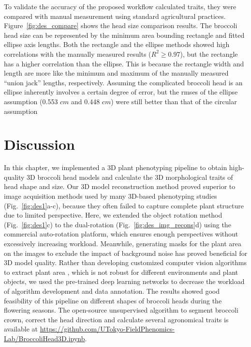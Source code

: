 To validate the accuracy of the proposed workflow calculated traits, they were compared with manual measurement using standard agricultural practices. Figure~\ref{fig:des_compare} shows the head size comparison results. The broccoli head size can be represented by the minimum area bounding rectangle and fitted ellipse axis lengths. Both the rectangle and the ellipse methods showed high correlations with the manually measured results ($R^2 \geq 0.97$), but the rectangle has a higher correlation than the ellipse. This is because the rectangle width and length are more like the minimum and maximum of the manually measured ``union jack'' lengths, respectively. Assuming the complicated broccoli head is an ellipse inherently involves a certain degree of error, but the \gls{rmse}s of the ellipse assumption (0.553 $cm$ and 0.448 $cm$) were still better than that of the circular assumption \citep[Table 5, \gls{rmse}=0.97 $cm$]{blok_image_2021}



\section{Discussion}

In this chapter, we implemented a 3D plant phenotyping pipeline to obtain high-quality 3D broccoli head models and calculate the 3D morphological traits of head shape and size. Our 3D model reconstruction method proved superior to image acquisition methods used by many 3D-based phenotyping studies (Fig.~\ref{fig:des1}a-c), because they often failed to capture complete plant structure due to limited perspective. Here, we extended the object rotation method (Fig.~\ref{fig:des1}c) to the dual-rotation (Fig.~\ref{fig:des_img_recons}d) using the commercial auto-rotation platform, which ensures enough perspectives without excessively increasing workload. Meanwhile, generating masks for the plant area on the images to exclude the impact of background noise has proved beneficial for 3D model quality. Rather than developing customized computer vision algorithms to extract plant area \citep{nguyen_3d_2016,kochi_3d_2018,kochi_all_2022}, which is not robust for different environments and plant objects, we used the pre-trained deep learning networks to decrease the workload of algorithm development and data annotation. The results showed good feasibility of this pipeline on different shapes of broccoli heads during the flowering seasons. The open-source unsupervised algorithm to segment broccoli crown, correct the head direction and calculate several agronomical traits is available at \url{https://github.com/UTokyo-FieldPhenomics-Lab/BroccoliHead3D.ipynb}.

